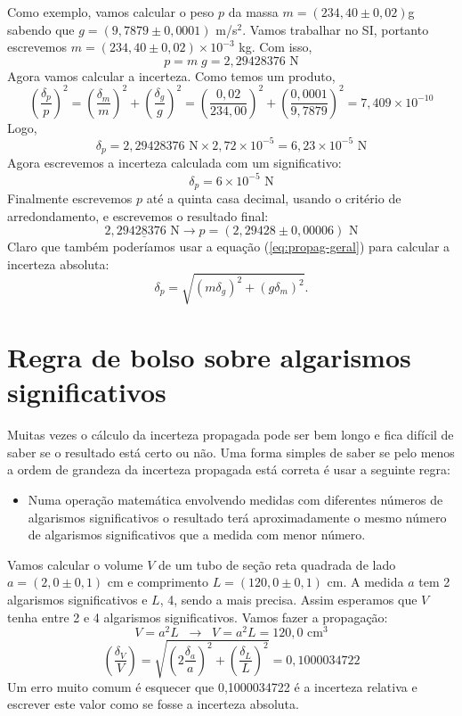 Como exemplo, vamos calcular o peso $p$ da massa $m=(234,\!40\pm 0,02)$g sabendo que $g=(9,\!7879\pm 0,\!0001)$ m/s$^2$. 
Vamos trabalhar no SI, portanto escrevemos $m=(234,\!40\pm 0,\!02)\times 10^{-3}$ kg. Com isso,
%
\[
 p =  m \;   g = 2,\!29428376 \mbox{ N}
\]
%
Agora vamos calcular a incerteza. Como temos um produto,
\[
\left(\frac{\delta_p}{  p}\right)^2=\left(\frac{\delta_m}{  m}\right)^2+\left(\frac{\delta_g}{  g}\right)^2=\left(\frac{0,\!02}{234,\!00}\right)^2+\left(\frac{0,\!0001}{9,\!7879}\right)^2=7,\!409\times 10^{-10}
\]
Logo, 
\[
\delta_p=2,\!29428376 \mbox{ N}\times 2,\!72 \times 10^{-5}=6,\!23\times 10^{-5} \mbox{ N}
\]
Agora escrevemos a incerteza calculada com um significativo: 
\[
\delta_p = 6\times 10^{-5} \mbox{ N}
\]
Finalmente escrevemos $  p$ até a quinta casa decimal, usando o critério de arredondamento, e escrevemos o resultado final:
\[
2,\!2942\underline{8}376 \mbox{ N}\rightarrow p = (2,\!29428\pm 0,\!00006)\mbox{ N}
\]
%
Claro que também poderíamos usar a equação (\ref{eq:propag-geral}) para calcular a incerteza absoluta:
\[
\delta_p =  \sqrt{ (  m\delta_g)^2+(  g \delta_m)^2}.
\]
%
%


%

%
%
%
\section{Regra de bolso sobre algarismos significativos}
%
Muitas vezes o cálculo da incerteza propagada pode ser bem longo e fica difícil de saber se o resultado está certo ou não. Uma forma simples de saber se pelo menos a ordem de grandeza da incerteza propagada está correta é usar a seguinte regra:
%
\begin{itemize}
%
\item Numa operação matemática envolvendo medidas com diferentes números de algarismos significativos o resultado terá aproximadamente o mesmo número de algarismos significativos que a medida com menor número.
%
\end{itemize}
%
%

Vamos calcular o volume $V$ de um tubo de seção reta quadrada de lado $a=(2,\!0\pm0,\!1)$ cm e comprimento $L=(120,\!0\pm 0,\!1)$ cm.  
A medida $a$ tem 2 algarismos significativos e $L$, 4, sendo a mais precisa. Assim esperamos que $V$ tenha entre 2 e 4 algarismos significativos. Vamos fazer a propagação:
\[
V=a^2L\;\;\rightarrow\;\;   V =   a^2  L= 120,\!0\mbox{ cm}^3 
\]
%
\[
\left(\frac{\delta_V}{  V}\right)=\sqrt{\left(2\frac{\delta_a}{  a}\right)^2+\left(\frac{\delta_L}{  L}\right)^2}=0,\!1000034722
\]
Um erro muito comum é esquecer que 0,1000034722 é a incerteza  relativa e escrever este valor como se fosse a incerteza absoluta.

